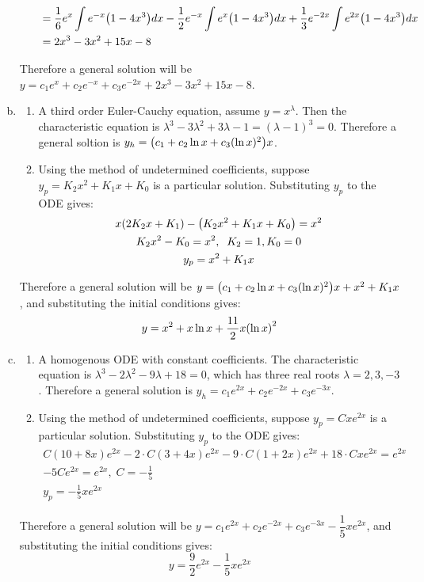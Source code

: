 \documentclass[10pt]{article}
\begin{document}
\begin{enumerate}[(a), leftmargin=*]
\begin{enumerate}[(1), leftmargin=*]
\begin{align*}
            &= \frac{1}{6}e^x\int{e^{-x}\qty(1-4x^3)}dx - \frac{1}{2}e^{-x}\int{e^x\qty(1-4x^3)}dx + \frac{1}{3}e^{-2x}\int{e^{2x}\qty(1-4x^3)}dx \\
            &= 2x^3 - 3x^2 + 15x - 8
        \end{align*}
    \end{enumerate}
    Therefore a general solution will be $y = c_1e^x + c_2e^{-x} + c_3e^{-2x} + 2x^3 - 3x^2 + 15x - 8$.
    \item \begin{enumerate}[(1), leftmargin=*]
        \item A third order Euler-Cauchy equation, assume $y = x^{\lambda}$. Then the characteristic equation is $\lambda^3 - 3\lambda^2 + 3\lambda - 1 = (\lambda - 1)^3 = 0$. 
        Therefore a general soltion is $y_h = \qty(c_1 + c_2\ln{x} + c_3(\ln{x})^2)x$.
        \item Using the method of undetermined coefficients, suppose $y_p = K_2x^2 + K_1x + K_0$ is a particular solution.
        Substituting $y_p$ to the ODE gives:
        \begin{gather*}
            x\qty(2K_2x + K_1) - \qty(K_2x^2 + K_1x + K_0) = x^2 \\
            K_2x^2 - K_0 = x^2, \;\; K_2 = 1, K_0 = 0 \\
            y_p = x^2 + K_1x
        \end{gather*}
    \end{enumerate}
    Therefore a general solution will be $y = \qty(c_1 + c_2\ln{x} + c_3(\ln{x})^2)x + x^2 + K_1x$, and substituting the initial conditions gives:
    $$y = x^2 + x\ln{x} + \frac{11}{2}x\qty(\ln{x})^2$$
    \item \begin{enumerate}[(1), leftmargin=*]
        \item A homogenous ODE with constant coefficients. The characteristic equation is $\lambda^3 - 2\lambda^2 - 9\lambda + 18 = 0$, which has three real roots $\lambda = 2, 3, -3$.
        Therefore a general solution is $y_h = c_1e^{2x} + c_2e^{-2x} + c_3e^{-3x}$.
        \item Using the method of undetermined coefficients, suppose $y_p = Cxe^{2x}$ is a particular solution.
        Substituting $y_p$ to the ODE gives:
        \begin{gather*}
            C(10+8x)e^{2x} - 2\cdot C(3+4x)e^{2x} - 9\cdot C(1+2x)e^{2x} + 18\cdot Cxe^{2x} = e^{2x} \\
            -5Ce^{2x} = e^{2x}, \; C = -\frac{1}{5} \\
            y_p = -\frac{1}{5}xe^{2x}
        \end{gather*}
    \end{enumerate}
    Therefore a general solution will be $y = c_1e^{2x} + c_2e^{-2x} + c_3e^{-3x} - \dfrac{1}{5}xe^{2x}$, and substituting the initial conditions gives:
    $$y = \frac{9}{2}e^{2x} - \dfrac{1}{5}xe^{2x}$$
\end{enumerate}
\end{document}
